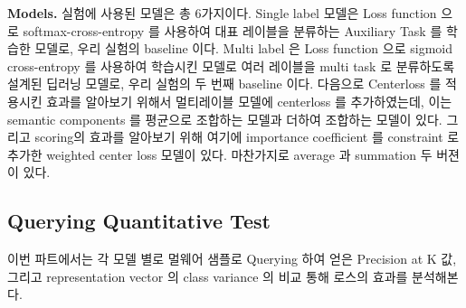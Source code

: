 \textbf{Models. }
실험에 사용된 모델은 총 6가지이다. Single label 모델은 Loss function 으로 softmax-cross-entropy 를 사용하여 대표 레이블을 분류하는 Auxiliary Task 를 학습한 모델로, 우리 실험의 baseline 이다. Multi label 은  Loss function 으로 sigmoid cross-entropy 를 사용하여 학습시킨 모델로 여러 레이블을 multi task 로 분류하도록 설계된 딥러닝 모델로, 우리 실험의 두 번째 baseline 이다. 다음으로 Centerloss 를 적용시킨 효과를 알아보기 위해서 멀티레이블 모델에 centerloss 를 추가하였는데, 이는 semantic components 를 평균으로 조합하는 모델과 더하여 조합하는 모델이 있다. 그리고 scoring의 효과를 알아보기 위해 여기에 importance coefficient 를 constraint 로 추가한 weighted center loss 모델이 있다. 마찬가지로 average 과 summation 두 버젼이 있다. 



\subsection{Querying Quantitative Test}

이번 파트에서는 각 모델 별로 멀웨어 샘플로 Querying 하여 얻은  Precision at K 값, 그리고 representation vector 의 class variance 의 비교 통해 로스의 효과를 분석해본다. 

